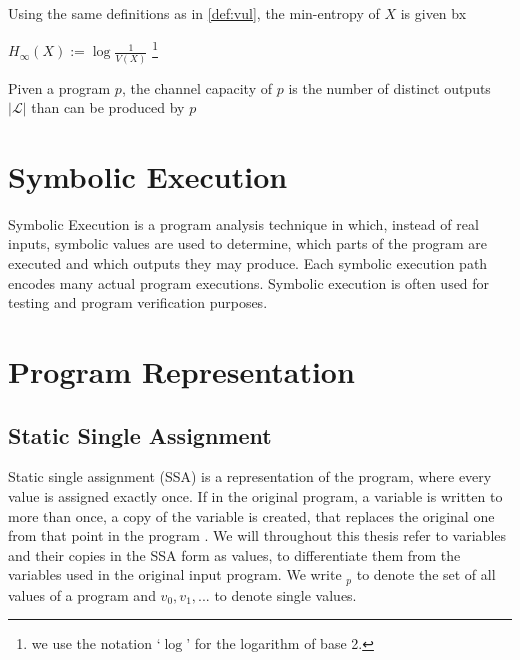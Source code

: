\begin{definition}
    Using the same definitions as in \ref{def:vul}, the min-entropy of $X$ is given bx
    \begin{center}
        $H_\infty (X) := \log \frac{1}{V(X)}$ \footnote{we use the notation `$\log$' for the logarithm of base 2.}
    \end{center}
\end{definition}

\begin{definition}
    Piven a program $p$, the channel capacity of $p$ is the number of distinct outputs $|\mathcal{L}|$ than can be produced by $p$
\end{definition}


\section{Symbolic Execution}
Symbolic Execution is a program analysis technique in which, instead of real inputs, symbolic values are used to determine, which parts of the program are executed and which outputs they may produce. Each symbolic execution path encodes many actual program executions.
Symbolic execution is often used for testing and program verification purposes.



\section{Program Representation}

\subsection{Static Single Assignment}
Static single assignment (SSA) is a representation of the program, where every value is assigned exactly once. If in the original program, a variable is written to more than once, a copy of the variable is created, that replaces the original one from that point in the program \cite{cytron91}.  We will throughout this thesis refer to variables and their copies in the SSA form as values, to differentiate them from the variables used in the original input program. We write \val$_p$ to denote the set of all values of a program and $v_0, v_1, ...$ to denote single values.


